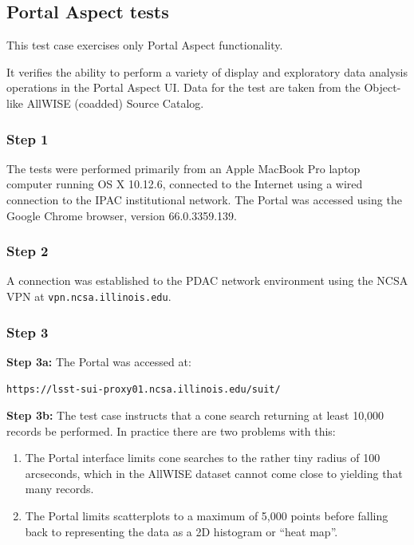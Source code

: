 
\subsection{Portal Aspect tests}

This test case exercises only Portal Aspect functionality.

It verifies the ability to perform a variety of display and exploratory data analysis
operations in the Portal Aspect UI.
Data for the test are taken from the Object-like AllWISE (coadded) Source Catalog.

\subsubsection{Step 1}

The tests were performed primarily from an Apple MacBook Pro laptop computer running OS X 10.12.6,
connected to the Internet using a wired connection to the IPAC institutional network.
The Portal was accessed using the Google Chrome browser, version 66.0.3359.139.

\subsubsection{Step 2}

A connection was established to the PDAC network environment using the NCSA VPN at \texttt{vpn.ncsa.illinois.edu}.

\subsubsection{Step 3}

\textbf{Step 3a:} The Portal was accessed at:

\begin{center}
\texttt{https://lsst-sui-proxy01.ncsa.illinois.edu/suit/}
\end{center}

\textbf{Step 3b:} The test case instructs that a cone search returning at least 10,000 records be performed.
In practice there are two problems with this:

\begin{enumerate}
\item{The Portal interface limits cone searches to the rather tiny radius of 100 arcseconds,
which in the AllWISE dataset cannot come close to yielding that many records.}
\item{The Portal limits scatterplots to a maximum of 5,000 points before falling back to representing the data as a 2D histogram or ``heat map''.}
\end{enumerate}

